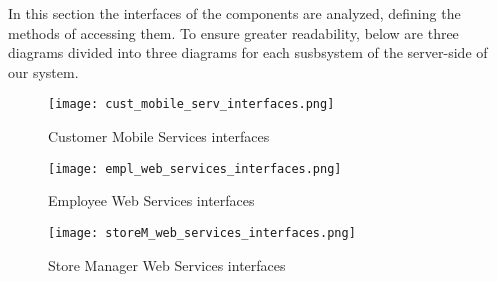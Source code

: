 In this section the interfaces of the components are analyzed, defining the methods of accessing them. To ensure greater readability, below are three diagrams divided into three diagrams for each susbsystem of the server-side of our system.

\begin{figure}[H]
    \centering
    \texttt{[image: cust\_mobile\_serv\_interfaces.png]}
    \caption{Customer Mobile Services interfaces}
\end{figure}

\begin{figure}[H]
    \centering
    \texttt{[image: empl\_web\_services\_interfaces.png]}
    \caption{Employee Web Services interfaces}
\end{figure}

\begin{figure}[H]
    \centering
    \texttt{[image: storeM\_web\_services\_interfaces.png]}
    \caption{Store Manager Web Services interfaces}
\end{figure}